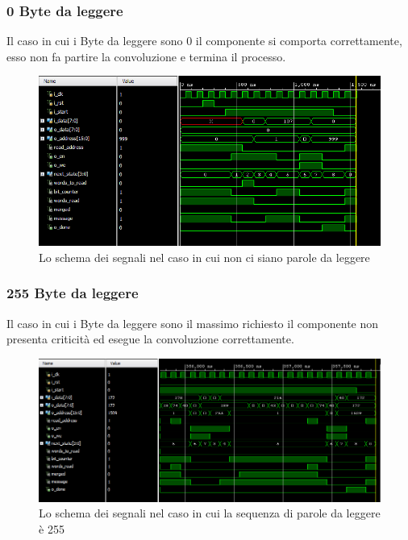 \subsubsection{0 Byte da leggere}
Il caso in cui i Byte da leggere sono 0 il componente si comporta correttamente, esso non fa partire la convoluzione e termina il processo.
\begin{figure}[!htb]
    \includegraphics[keepaspectratio=true,scale=0.7]{images/Capitolo3/min.PNG}
    \caption{Lo schema dei segnali nel caso in cui non ci siano parole da leggere}
    \label{fig:signal1}
\end{figure}
\subsubsection{255 Byte da leggere}
Il caso in cui i Byte da leggere sono il massimo richiesto il componente non presenta criticità ed esegue la convoluzione correttamente.
\begin{figure}[!htb]
    \includegraphics[keepaspectratio=true,scale=0.65]{images/Capitolo3/max.PNG}
    \caption{Lo schema dei segnali nel caso in cui la sequenza di parole da leggere è 255}
    \label{fig:signal2}
\end{figure}
